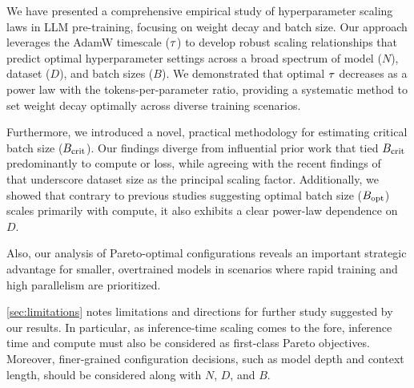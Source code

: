 We have presented a comprehensive empirical study of hyperparameter
scaling laws in LLM pre-training, focusing on weight decay and batch
size. Our approach leverages the AdamW timescale ($\tau$) to
develop robust scaling relationships that predict optimal
hyperparameter settings across a broad spectrum of model ($N$),
dataset ($D$), and batch sizes ($B$). We demonstrated that optimal
$\tau$ decreases as a power law with the tokens-per-parameter
ratio, providing a systematic method to set weight decay optimally
across diverse training scenarios.

Furthermore, we introduced a novel, practical methodology for
estimating critical batch size ($B_{\text{crit}}$). Our findings diverge from
influential prior work that tied $B_{\text{crit}}$ predominantly to compute or
loss, while agreeing with the recent findings of~\citet{zhang2024how}
that underscore dataset size as the principal scaling factor.
Additionally, we showed that contrary to previous studies suggesting
optimal batch size ($B_{\text{opt}}$) scales primarily with compute, it also
exhibits a clear power-law dependence on $D$.

Also, our analysis of Pareto-optimal configurations reveals an
important strategic advantage for smaller, overtrained models in
scenarios where rapid training and high parallelism are prioritized.

\cref{sec:limitations} notes limitations and directions for
further study suggested by our results.
%
In particular, as inference-time scaling comes to the fore, inference
time and compute must also be considered as first-class Pareto
objectives.  Moreover, finer-grained configuration decisions, such as
model depth and context length, should be considered along with $N$,
$D$, and $B$.
